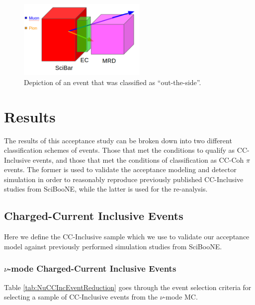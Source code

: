 \documentclass[11pt]{article}
\begin{document}
\begin{figure}[H]
\centering
\includegraphics[width=0.55\textwidth]{EventClassifications/OutTheSide.png}
\caption{Depiction of an event that was classified as ``out-the-side''.}
\label{fig:OutTheSideEvent}
\end{figure}




\section{Results}
\label{sec:Results}
The results of this acceptance study can be broken down into two different classification schemes of events. Those that met the conditions to qualify as CC-Inclusive events, and those that met the conditions of classification as CC-Coh $\pi$ events. The former is used to validate the acceptance modeling and detector simulation in order to reasonably reproduce previously published CC-Inclusive studies from SciBooNE, while the latter is used for the re-analysis.

\subsection{Charged-Current Inclusive Events}
\label{sub:CCInclusive}

Here we define the CC-Inclusive sample which we use to validate our acceptance model against previously performed simulation studies from SciBooNE.

\subsubsection{$\nu$-mode Charged-Current Inclusive Events}
\label{subsub:NuModeCCInclusive}
Table \ref*{tab:NuCCIncEventReduction} goes through the event selection criteria for selecting a sample of CC-Inclusive events from the $\nu$-mode MC.
\end{document}

